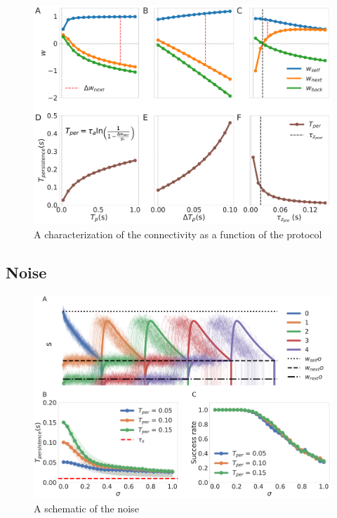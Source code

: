 \documentclass[10pt,a4paper]{article}
\begin{document}
\begin{figure}[H]
\centering
\includegraphics[scale=0.15]{training.pdf}
\caption{A characterization of the connectivity as a function of the protocol}
\label{fig:training}
\end{figure}

\subsection{Noise}

\begin{figure}[H]
\centering
\includegraphics[scale=0.30]{noise_diagram.pdf}
\caption{A schematic of the noise}
\label{fig:noise_scheme}
\end{figure}
\end{document}
